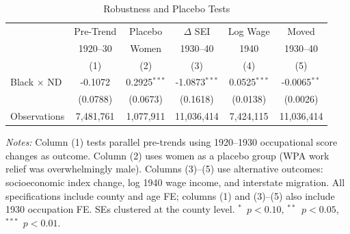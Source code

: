 \begin{table}[t]
\centering
\caption{Robustness and Placebo Tests}
\label{tab:robust}
\begin{tabular}{lccccc}
\toprule
 & Pre-Trend & Placebo & $\Delta$ SEI & Log Wage & Moved \\
 & 1920--30 & Women & 1930--40 & 1940 & 1930--40 \\
 & (1) & (2) & (3) & (4) & (5) \\
\midrule
Black $\times$ ND & -0.1072 & 0.2925$^{***}$ & -1.0873$^{***}$ & 0.0525$^{***}$ & -0.0065$^{**}$ \\
 & (0.0788) & (0.0673) & (0.1618) & (0.0138) & (0.0026) \\[6pt]
Observations & 7,481,761 & 1,077,911 & 11,036,414 & 7,424,115 & 11,036,414 \\
\bottomrule
\end{tabular}
\begin{tablenotes}
\item \textit{Notes:} Column (1) tests parallel pre-trends using 1920--1930 occupational score changes as outcome. Column (2) uses women as a placebo group (WPA work relief was overwhelmingly male). Columns (3)--(5) use alternative outcomes: socioeconomic index change, log 1940 wage income, and interstate migration. All specifications include county and age FE; columns (1) and (3)--(5) also include 1930 occupation FE. SEs clustered at the county level. $^{*}$~$p<0.10$, $^{**}$~$p<0.05$, $^{***}$~$p<0.01$.
\end{tablenotes}
\end{table}
